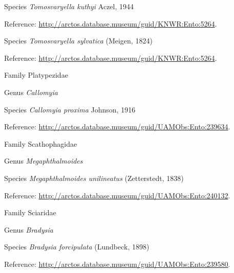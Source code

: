 \documentclass[9pt, article]{memoir}
\begin{document}
\begin{multicols}{2}
\vspace{6pt}\noindent\hspace{36pt}Species \textit{Tomosvaryella kuthyi} Aczel, 1944


Reference: 
\url{http://arctos.database.museum/guid/KNWR:Ento:5264}.

\vspace{6pt}\noindent\hspace{36pt}Species \textit{Tomosvaryella sylvatica} (Meigen, 1824)


Reference: 
\url{http://arctos.database.museum/guid/KNWR:Ento:5264}.

\vspace{6pt}\noindent\hspace{24pt}Family Platypezidae


\vspace{6pt}\noindent\hspace{30pt}Genus \textit{Callomyia}


\vspace{6pt}\noindent\hspace{36pt}Species \textit{Callomyia proxima} Johnson, 1916


Reference: 
\url{http://arctos.database.museum/guid/UAMObs:Ento:239634}.

\vspace{6pt}\noindent\hspace{24pt}Family Scathophagidae


\vspace{6pt}\noindent\hspace{30pt}Genus \textit{Megaphthalmoides}


\vspace{6pt}\noindent\hspace{36pt}Species \textit{Megaphthalmoides unilineatus} (Zetterstedt, 1838)


Reference: 
\url{http://arctos.database.museum/guid/UAMObs:Ento:240132}.

\vspace{6pt}\noindent\hspace{24pt}Family Sciaridae


\vspace{6pt}\noindent\hspace{30pt}Genus \textit{Bradysia}


\vspace{6pt}\noindent\hspace{36pt}Species \textit{Bradysia forcipulata} (Lundbeck, 1898)


Reference: 
\url{http://arctos.database.museum/guid/UAMObs:Ento:239580}.


\end{multicols}
\end{document}
